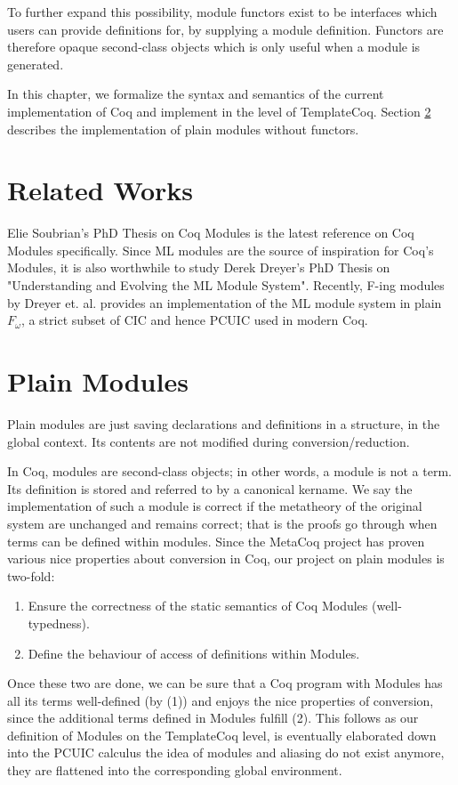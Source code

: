 To further expand this possibility, module functors exist to be interfaces which
users can provide definitions for, by supplying a module definition. Functors
are therefore opaque second-class objects which is only useful when a module is
generated.

In this chapter, we formalize the syntax and semantics of the current
implementation of Coq and implement in the level of TemplateCoq. Section
\ref{sec:plainmodules} describes the implementation of plain modules
without functors.


\section{Related Works}
Elie Soubrian's PhD Thesis on Coq Modules is the latest reference on 
Coq Modules specifically. Since ML modules are the source of
inspiration for Coq's Modules, it is also worthwhile to study
Derek Dreyer's PhD Thesis on "Understanding and Evolving the ML Module 
System". Recently, F-ing modules by Dreyer et. al. provides an 
implementation of the ML module system in plain $F_\omega$, a strict 
subset of CIC and hence PCUIC used in modern Coq.

\section{Plain Modules}
\label{sec:plainmodules}

Plain modules are just saving declarations and definitions in a structure, in the
global context. Its contents are not modified during conversion/reduction.

In Coq, modules are second-class objects; in other words, a module is not a
term.  Its definition is stored and referred to by a canonical kername. We say
the implementation of such a module is correct if the metatheory of the original
system are unchanged and remains correct; that is the proofs go through when
terms can be defined within modules. Since the MetaCoq project has proven
various nice properties about conversion in Coq, our project on plain modules is
two-fold:
\begin{enumerate}
\item Ensure the correctness of the static semantics of Coq Modules
(well-typedness).
\item Define the behaviour of access of definitions within Modules.
\end{enumerate}

Once these two are done, we can be sure that a Coq program with Modules
has all its terms well-defined (by (1)) and enjoys the nice properties of
conversion, since the additional terms defined in Modules fulfill (2).
This follows as our definition of Modules on the TemplateCoq level, is
eventually elaborated down into the PCUIC calculus the idea of modules and
aliasing do not exist anymore, they are flattened into the corresponding global
environment.
